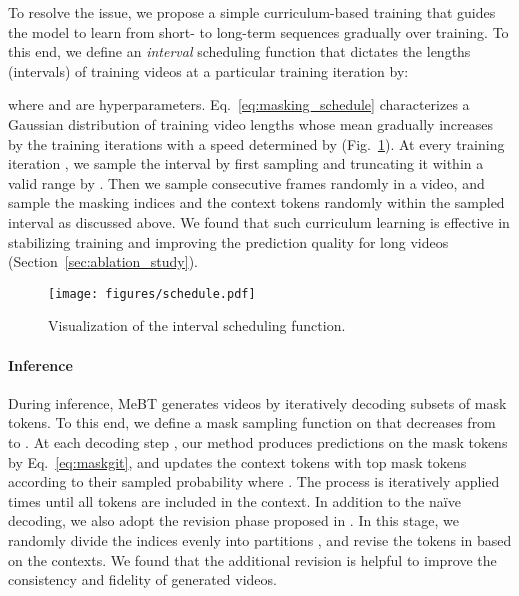 \documentclass[10pt,twocolumn,letterpaper]{article}
\begin{document}
To resolve the issue, we propose a simple curriculum-based training that guides the model to learn from short- to long-term sequences gradually over training. 
To this end, we define an \emph{interval} scheduling function that dictates the lengths (intervals)  of training videos at a particular training iteration  by:

where  and  are hyperparameters. 
Eq.~\eqref{eq:masking_schedule} characterizes a Gaussian distribution of training video lengths  whose mean gradually increases by the training iterations  with a speed determined by  (Fig.~\ref{fig:video_schedule}).
At every training iteration , we sample the interval  by first sampling  and truncating it within a valid range by . 
Then we sample  consecutive frames randomly in a video, and sample the masking indices  and the context tokens randomly within the sampled interval as discussed above.
We found that such curriculum learning is effective in stabilizing training and improving the prediction quality for long videos (Section~\ref{sec:ablation_study}).

\begin{figure}
    \centering
    \texttt{[image: figures/schedule.pdf]}
    \vspace{-0.2cm}
    \caption{Visualization of the interval scheduling function. 
    }
    \label{fig:video_schedule}
    \vspace{-0.7cm}
\end{figure}



\vspace{-0.2cm}
\paragraph{Inference} 
During inference, MeBT generates videos by iteratively decoding subsets of mask tokens.
To this end, we define a mask sampling function  on  that decreases from  to .
At each decoding step , our method produces predictions on the mask tokens by Eq.~\eqref{eq:maskgit}, and updates the context tokens with top  mask tokens according to their sampled probability where .
The process is iteratively applied  times until all tokens are included in the context.
In addition to the na\"ive decoding, we also adopt the revision phase proposed in \cite{draft_and_revise}. 
In this stage, we randomly divide the indices evenly into  partitions , and revise the tokens in  based on the contexts. 
We found that the additional revision is helpful to improve the consistency and fidelity of generated videos.
\end{document}
